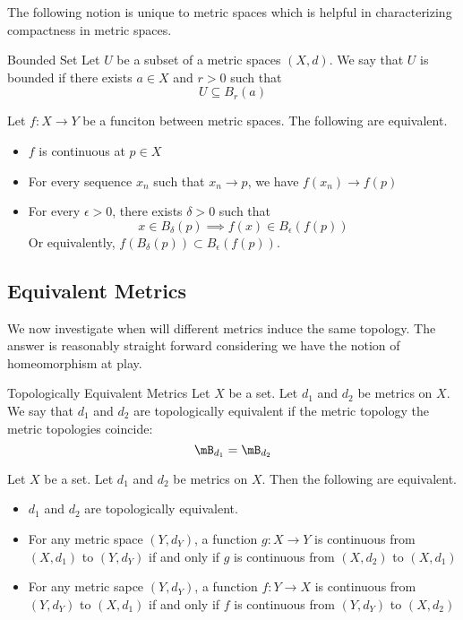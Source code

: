 \documentclass[a4paper]{article}
\begin{document}
The following notion is unique to metric spaces which is helpful in characterizing compactness in metric spaces. 

\begin{defn}{Bounded Set}{} Let $U$ be a subset of a metric spaces $(X,d)$. We say that $U$ is bounded if there exists $a\in X$ and $r>0$ such that $$U\subseteq B_r(a)$$
\end{defn}

\begin{prp}{}{} Let $f:X\to Y$ be a funciton between metric spaces. The following are equivalent. 
\begin{itemize}
\item $f$ is continuous at $p\in X$
\item For every sequence $x_n$ such that $x_n\to p$, we have $f(x_n)\to f(p)$
\item For every $\epsilon>0$, there exists $\delta>0$ such that $$x\in B_{\delta}(p)\implies f(x)\in B_{\epsilon}(f(p))$$ Or equivalently, $f(B_{\delta}(p))\subset B_{\epsilon}(f(p))$. 
\end{itemize}
\end{prp}

\subsection{Equivalent Metrics}
We now investigate when will different metrics induce the same topology. The answer is reasonably straight forward considering we have the notion of homeomorphism at play. 

\begin{defn}{Topologically Equivalent Metrics}{} Let $X$ be a set. Let $d_1$ and $d_2$ be metrics on $X$. We say that $d_1$ and $d_2$ are topologically equivalent if the metric topology the metric topologies coincide: $$\mB_{d_1}=\mB_{d_2}$$
\end{defn}

\begin{prp}{}{} Let $X$ be a set. Let $d_1$ and $d_2$ be metrics on $X$. Then the following are equivalent. 
\begin{itemize}
\item $d_1$ and $d_2$ are topologically equivalent. 
\item For any metric space $(Y,d_Y)$, a function $g:X\to Y$ is continuous from $(X,d_1)$ to $(Y,d_Y)$ if and only if $g$ is continuous from $(X,d_2)$ to $(X,d_1)$
\item For any metric sapce $(Y,d_Y)$, a function $f:Y\to X$ is continuous from $(Y,d_Y)$ to $(X,d_1)$ if and only if $f$ is continuous from $(Y,d_Y)$ to $(X,d_2)$
\end{itemize}
\end{prp}
\end{document}
